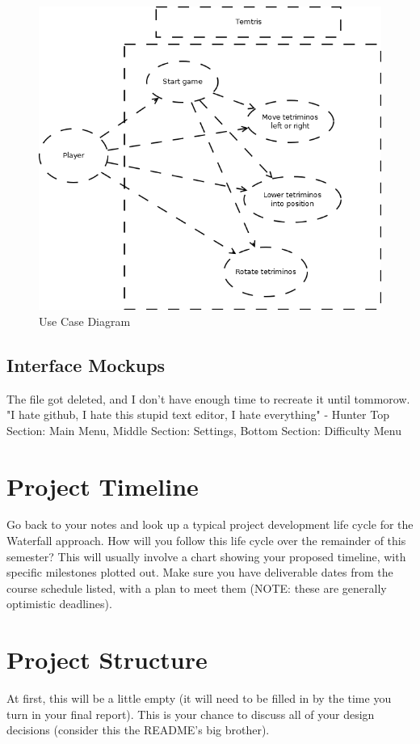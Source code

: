 \documentclass[10pt,conference,onecolumn,compsoc]{IEEEtran}
\begin{document}
\begin{figure}[ht!]
\includegraphics[scale=.5]{UseCaseDiagram.png}
\caption{Use Case Diagram}
\label{Diagram1}
\end{figure}

\subsection{Interface Mockups}
The file got deleted, and I don't have enough time to recreate it until tommorow. 
"I hate github, I hate this stupid text editor, I hate everything" - Hunter
Top Section: Main Menu, Middle Section: Settings, Bottom Section: Difficulty Menu


\section{Project Timeline}
Go back to your notes and look up a typical project development life cycle for the Waterfall approach.  How will you follow this life cycle over the remainder of this semester?  This will usually involve a chart showing your proposed timeline, with specific milestones plotted out.  Make sure you have deliverable dates from the course schedule listed, with a plan to meet them (NOTE: these are generally optimistic deadlines).

\section{Project Structure}
At first, this will be a little empty (it will need to be filled in by the time you turn in your final report).  This is your chance to discuss all of your design decisions (consider this the README's big brother).
\end{document}
